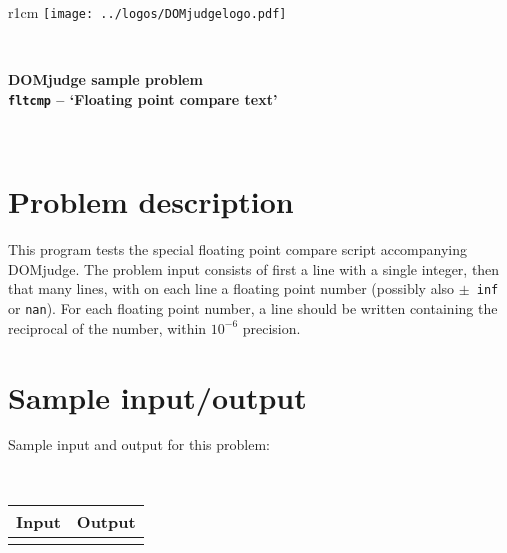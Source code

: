 \documentclass[a4paper,12pt]{article}
\begin{document}
\begin{wrapfigure}[1]{r}{1cm}
  \texttt{[image: ../logos/DOMjudgelogo.pdf]}
\end{wrapfigure}
~\\
\begin{center}
  \Large\bf \textsc{DOM}judge sample problem\\
  \texttt{fltcmp} -- `Floating point compare text'
\end{center}
~\\

\section*{Problem description}

This program tests the special floating point compare script
accompanying \textsc{DOM}judge. The problem input consists of first a
line with a single integer, then that many lines, with on each line a
floating point number (possibly also \texttt{$\pm$ inf} or
\texttt{nan}). For each floating point number, a line should be
written containing the reciprocal of the number, within $10^{-6}$
precision.

\section*{Sample input/output}

Sample input and output for this problem:

~\\
\begin{tabular}{|p{}|p{}|}
\hline
\textbf{Input} & \textbf{Output} \\
\hline
 &
 \\
\hline
\end{tabular}
\end{document}
